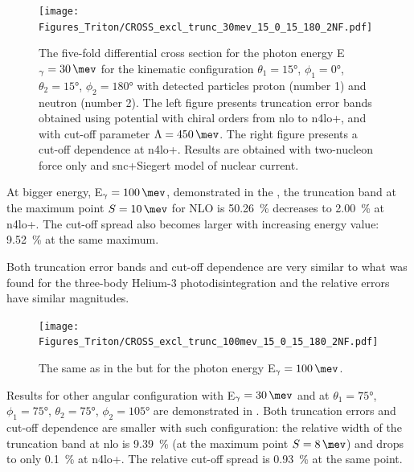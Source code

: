     \begin{figure}[h]
        \begin{center}
            \texttt{[image: Figures\_Triton/CROSS\_excl\_trunc\_30mev\_15\_0\_15\_180\_2NF.pdf]}
            \end{center}
            \caption{The five-fold differential cross section for the photon 
            energy E$_\gamma=\SI{30}{\mev}$ for the kinematic configuration
            $\theta_1 = \ang{15}$, $\phi_1 = \ang{0}$,
            $\theta_2 = \ang{15}$, $\phi_2 = \ang{180}$ with detected particles proton (number 1) and neutron (number 2).
            The left figure presents truncation error bands obtained using potential
            with chiral orders from \gls{nlo} to \gls{n4lo+}, and with
            cut-off parameter $\Lambda=\SI{450}{\mev}$.
            The right figure presents a cut-off dependence at \gls{n4lo+}.
            Results are obtained with two-nucleon force only and \gls{snc}+Siegert model of nuclear current.}
            \label{CROSS_Triton_EXCL_30_15_0_15_180}
    \end{figure}

    At bigger energy, E$_\gamma=\SI{100}{\mev}$, demonstrated in the ,
    the truncation band at the maximum point $S=\SI{10}{\mev}$ for NLO is \SI{50.26}{\percent}
    decreases to \SI{2.00}{\percent} at \gls{n4lo+}.
    The cut-off spread also becomes larger with increasing energy value: \SI{9.52}{\percent}
    at the same maximum.

    Both truncation error bands and cut-off dependence are very similar to what was found for
    the three-body Helium-3 photodisintegration and the relative errors 
    have similar magnitudes.

    \begin{figure}[h]
        \begin{center}
            \texttt{[image: Figures\_Triton/CROSS\_excl\_trunc\_100mev\_15\_0\_15\_180\_2NF.pdf]}
            \end{center}
            \caption{The same as in the  but for the photon energy
            E$_\gamma = \SI{100}{\mev}$.}
            \label{CROSS_Triton_EXCL_100mev_15_0_15_180}
    \end{figure}



    Results for other angular configuration with E$_\gamma=\SI{30}{\mev}$ and at 
    $\theta_1 = \ang{75}$, $\phi_1 = \ang{75}$,
    $\theta_2 = \ang{75}$, $\phi_2 = \ang{105}$ are
    demonstrated in .
    Both truncation errors and cut-off dependence are smaller with such configuration:
    the relative  width of the truncation band at \gls{nlo} is \SI{9.39}{\percent}
    (at the maximum point $S=\SI{8}{\mev}$) and drops to only \SI{0.1}{\percent}
    at \gls{n4lo+}. The relative cut-off spread is \SI{0.93}{\percent} at the same point.

